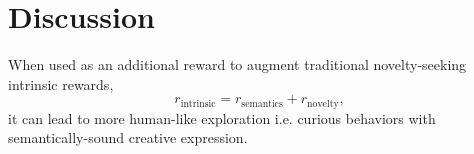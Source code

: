 \chapter{Discussion}
\label{sec:discussion}


When used as an additional reward to augment traditional novelty-seeking intrinsic rewards, 
\begin{equation}
    \label{eq:intrinsic-reward}
    r_{\text{intrinsic}} = r_{\text{semantics}} + r_{\text{novelty}},
\end{equation}
it can lead to more human-like exploration i.e. curious behaviors with semantically-sound creative expression.
